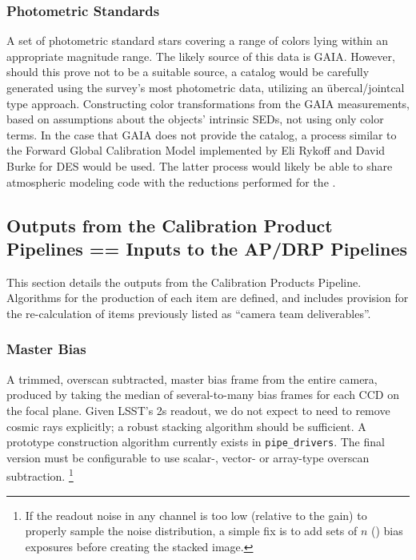 \subsubsection{Photometric Standards}\label{sec:CPP:inputs:photometricStandards} 
A set of photometric standard stars covering a range of colors lying within an appropriate magnitude range. The likely source of this data is GAIA. However, should this prove not to be a suitable source, a catalog would be carefully generated using the survey's most photometric data, utilizing an \"ubercal/jointcal type approach.
\alg Constructing color transformations from the GAIA measurements, based on assumptions about the objects' intrinsic SEDs, \ie not using only color terms. In the case that GAIA does not provide the catalog, a process similar to the Forward Global Calibration Model implemented by  Eli Rykoff and David Burke for DES would be used. The latter process would likely be able to share atmospheric modeling code with the reductions performed for the \auxtelescope.


\subsection{Outputs from the Calibration Product Pipelines == Inputs to the AP/DRP Pipelines}
\label{sec:CPP:output}

This section details the outputs from the Calibration Products Pipeline. Algorithms for the production of each item are defined, and includes provision for the re-calculation of items previously listed as ``camera team deliverables''.

\subsubsection{Master Bias}\label{sec:CPP:output:bias}
A trimmed, overscan subtracted, master bias frame from the entire camera, produced by taking the median of several-to-many bias frames for each CCD on the focal plane.
\alg Given LSST's 2s readout, we do not expect to need to remove cosmic rays explicitly; a robust stacking algorithm should be sufficient. A prototype construction algorithm currently exists in \texttt{pipe\_drivers}. The final version must be configurable to use scalar-, vector- or array-type overscan subtraction. 
\footnote{If the readout noise in any channel is too low (relative to the
gain) to properly sample the noise distribution, a simple fix is to add sets of $n$ () bias exposures before creating the stacked image.}

